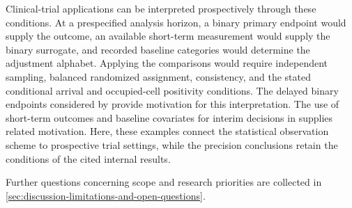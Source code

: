 Clinical-trial applications can be interpreted prospectively through these conditions. At a prespecified analysis horizon, a binary primary endpoint would supply the outcome, an available short-term measurement would supply the binary surrogate, and recorded baseline categories would determine the adjustment alphabet. Applying the comparisons would require independent sampling, balanced randomized assignment, consistency, and the stated conditional arrival and occupied-cell positivity conditions. The delayed binary endpoints considered by \citet[Abstract]{MarschnerBecker2001} provide motivation for this interpretation. The use of short-term outcomes and baseline covariates for interim decisions in \citet[Abstract]{VanLancker2020} supplies related motivation. Here, these examples connect the statistical observation scheme to prospective trial settings, while the precision conclusions retain the conditions of the cited internal results.

Further questions concerning scope and research priorities are collected in \cref{sec:discussion-limitations-and-open-questions}.
